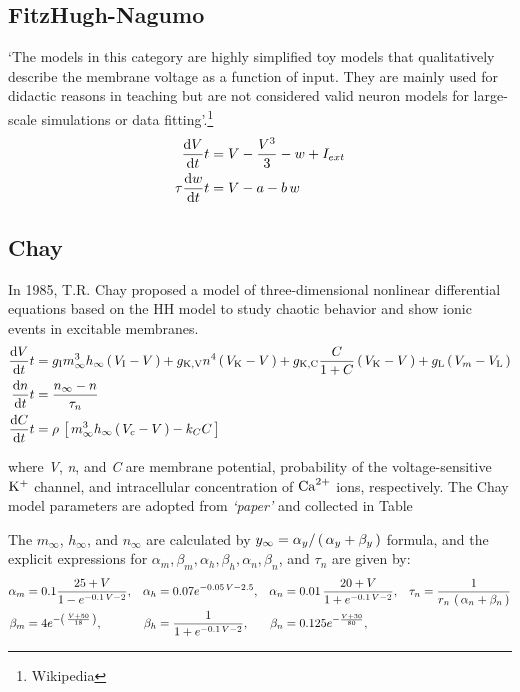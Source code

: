 \documentclass[../../Orator.tex]{subfiles}
\begin{document}
\subsection{FitzHugh-Nagumo}
`The models in this category are highly simplified toy models that qualitatively describe the membrane voltage as a function of input. They are mainly used for didactic reasons in teaching but are not considered valid neuron models for large-scale simulations or data fitting'.\footnote{Wikipedia}
\begin{subequations}\label{eq:FitNagSys}
    \begin{align}
        \ode{V}{t} &= V - \frac{V^3}{3} - w + I_{ext} \\ 
        \tau\ode{w}{t} &= V - a - b\,w 
    \end{align}
\end{subequations}


\subsection{Chay}
In 1985, T.R. Chay proposed a model of three-dimensional nonlinear differential equations based on the HH model to study chaotic behavior and show ionic events in excitable membranes. 
\begin{subequations}\label{eq:ChaySys}
    \begin{align}
        \ode{V}{t} &= g_\rmm{I}  m^3_\infty h_\infty \br{V_\rmm{I} - V} + g_\rmm{K, V} n^4 \br{V_\rmm{K} - V} + g_\rmm{K, C}  \frac{C}{1+C}\br{V_\rmm{K} - V} + g_\rmm{L} \br{V_m - V_\rmm{L}} \\ 
        \ode{n}{t} &= \frac{n_\infty - n}{\tau_n} \\
        \ode{C}{t} &= \rho \, \sbr{m^3_\infty h_\infty \br{V_c - V} - k_C C}
    \end{align}
\end{subequations}

where \textit{V}, \textit{n}, and \textit{C} are membrane potential, probability of the voltage-sensitive \(\mathrm{K}^+\) channel, and intracellular concentration of \(\mathrm{Ca}^{2+}\) ions, respectively. The Chay model parameters are adopted from \textit{`paper'} and collected in Table

The \(m_\infty\), \(h_\infty\), and \(n_\infty\) are calculated by \(y_\infty = \alpha_y / \br{\alpha_y + \beta_y} \) formula, and the explicit expressions for 
\(\alpha_m, \beta_m, \alpha_h, \beta_h, \alpha_n, \beta_n\), and \(\tau_n\) are given by:
\begin{align*}
    \alpha_m &= 0.1 \frac{ 25 + V }{1 - e^{-0.1 \, V - 2}}, &
    \alpha_h &=  0.07 e^{-0.05\,V -2.5}, &
    \alpha_n &= 0.01 \, \frac{ 20 + V }{ 1 + e^{-0.1 \, V - 2}}, &
    \tau_n &= \frac{1}{ r_n \, \br{\alpha_n + \beta_n} } \\
    \beta_m  &= 4 e^{-\br{\frac{ V + 50 }{ 18 } } }, &
    \beta_h  &= \frac{ 1 }{ 1 + e^{-0.1 \, V - 2}}, &
    \beta_n  &= 0.125 e^{- \frac{V + 30}{80}}, &
\end{align*}
\end{document}
